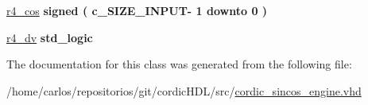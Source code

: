 \begin{DoxyCompactItemize}
\item 
\mbox{\label{classcordic__sincos__engine_1_1rtl_a3ee1ebbc3404b01d1cf24b1027d37a35}} 
\hyperlink{classcordic__sincos__engine_1_1rtl_a3ee1ebbc3404b01d1cf24b1027d37a35}{r4\+\_\+cos} {\bfseries \textcolor{vhdlchar}{signed}\textcolor{vhdlchar}{ }\textcolor{vhdlchar}{(}\textcolor{vhdlchar}{ }\textcolor{vhdlchar}{ }\textcolor{vhdlchar}{ }\textcolor{vhdlchar}{ }\textcolor{vhdlchar}{c\+\_\+\+S\+I\+Z\+E\+\_\+\+I\+N\+P\+UT}\textcolor{vhdlchar}{-\/}\textcolor{vhdlchar}{ } \textcolor{vhdldigit}{1} \textcolor{vhdlchar}{ }\textcolor{vhdlchar}{downto}\textcolor{vhdlchar}{ }\textcolor{vhdlchar}{ } \textcolor{vhdldigit}{0} \textcolor{vhdlchar}{ }\textcolor{vhdlchar}{)}\textcolor{vhdlchar}{ }} 
\item 
\mbox{\label{classcordic__sincos__engine_1_1rtl_ae3964ff68a7fe09c79d6944e64886736}} 
\hyperlink{classcordic__sincos__engine_1_1rtl_ae3964ff68a7fe09c79d6944e64886736}{r4\+\_\+dv} {\bfseries \textcolor{vhdlchar}{std\+\_\+logic}\textcolor{vhdlchar}{ }} 
\end{DoxyCompactItemize}


The documentation for this class was generated from the following file\+:\begin{DoxyCompactItemize}
\item 
/home/carlos/repositorios/git/cordic\+H\+D\+L/src/\hyperlink{cordic__sincos__engine_8vhd}{cordic\+\_\+sincos\+\_\+engine.\+vhd}\end{DoxyCompactItemize}
